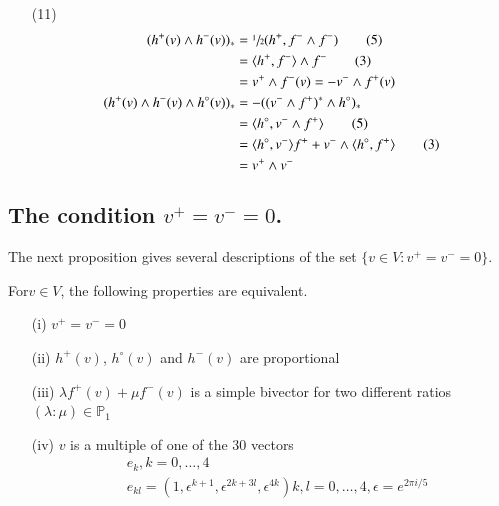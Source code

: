 \begin{itemize}
\item[(11)]
\begin{align*}
(h^{+}(v)\wedge h^{-}(v))_{*} &= \sfrac{1}{2}(h^{+},f^{-}\wedge f^{-})\tag{5}\\
&= \langle h^{+},f^{-}\rangle \wedge f^{-}\tag{3}\\
&=v^{+}\wedge f^{-}(v)=-v^{-}\wedge f^{+}(v)\\
(h^{+}(v)\wedge h^{-}(v)\wedge h^{\circ}(v))_{*} &= -((v^{-}\wedge
f^{+})^{*}\wedge h^{\circ})_{*}\\
&= \langle h^{\circ},v^{-}\wedge f^{+}\rangle\tag{5}\\
&= \langle h^{\circ},v^{-}\rangle f^{+}+v^{-}\wedge \langle
h^{\circ},f^{+}\rangle \tag{3}\\
&= v^{+}\wedge v^{-}
\end{align*}
\end{itemize}

\subsection{The condition \texorpdfstring{\boldmath$v^{+}=v^{-}=0$}{v0}.}\label{chap2-sec2.3}

The next proposition gives several descriptions of the set $\{v\in
V:v^{+}=v^{-}=0\}$. 

\begin{proposition}\label{chap2-prop1}
For\pageoriginale $v\in V$, the following properties are equivalent.
\begin{itemize}
\item[\rm(i)] $v^{+}=v^{-}=0$

\item[\rm(ii)] $h^{+}(v)$, $h^{\circ}(v)$ and $h^{-}(v)$ are
proportional

\item[\rm(iii)] $\lambda f^{+}(v)+\mu f^{-}(v)$ is a simple bivector
for two different ratios $(\lambda:\mu)\in \mathbb{P}_{1}$

\item[\rm(iv)] $v$ is a multiple of one of the 30 vectors
\begin{align*}
& e_{k}, k=0,\ldots,4\\
& e_{kl}=(1,\epsilon^{k+1},\epsilon^{2k+3l},\epsilon^{4k})k,
l=0,\ldots,4,\epsilon=e^{2\pi i/5}
\end{align*}
\end{itemize}
\end{proposition}

